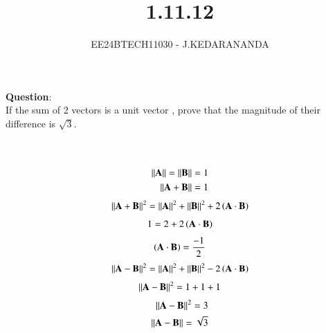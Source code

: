 \documentclass[journal]{IEEEtran}
\begin{document}

\vspace{3cm}

\title{1.11.12}
\author{EE24BTECH11030 - J.KEDARANANDA}
{\let\newpage\relax\maketitle}

\renewcommand{\thefigure}{\theenumi}
\renewcommand{\thetable}{\theenumi}
\setlength{\intextsep}{10pt} %


\renewcommand{\thetable}{\theenumi}


\textbf{Question}:\\
If the sum of 2 vectors is a unit vector , prove that the magnitude of their difference is $\sqrt{3}$.\hfill{}\\
\\ \solution \\
    \begin{table}[h!]    
      \centering
      
      \caption{}
    \end{table}
    \begin{align}
        \left\vert\left\vert\mathbf{A}\right\vert\right\vert = \left\vert\left\vert\mathbf{B}\right\vert\right\vert = 1 \\ \label{eq1.11.12.1}
        \left\vert\left\vert\mathbf{A}+\mathbf{B}\right\vert\right\vert = 1 
    \end{align}
    \begin{align}
        \left\vert\left\vert\mathbf{A}+\mathbf{B}\right\vert\right\vert^2 = \left\vert\left\vert\mathbf{A}\right\vert\right\vert^2 + \left\vert\left\vert\mathbf{B}\right\vert\right\vert^2 + 2\left(\mathbf{A} \cdot \mathbf{B}\right)\label{eq1.11.12.2}
    \end{align}
    \begin{align}
        1 = 2 + 2\left(\mathbf{A} \cdot \mathbf{B}\right) \label{eq1.11.12.3}
    \end{align}
    \begin{align}
        \left(\mathbf{A} \cdot \mathbf{B}\right) = \frac{-1}{2} \label{eq1.11.12.4}
    \end{align}
    \begin{align}
        \left\vert\left\vert\mathbf{A}-\mathbf{B}\right\vert\right\vert^2 = \left\vert\left\vert\mathbf{A}\right\vert\right\vert^2 + \left\vert\left\vert\mathbf{B}\right\vert\right\vert^2 - 2\left(\mathbf{A} \cdot \mathbf{B}\right) \label{1.11.12.5}
    \end{align}
    \begin{align}
        \left\vert\left\vert\mathbf{A}-\mathbf{B}\right\vert\right\vert^2 = 1 + 1 + 1 \label{1.11.12.6} 
    \end{align}
    \begin{align}
        \left\vert\left\vert\mathbf{A}-\mathbf{B}\right\vert\right\vert^2 = 3 \\
        \left\vert\left\vert\mathbf{A}-\mathbf{B}\right\vert\right\vert = \sqrt{3}
    \end{align}
\end{document}
